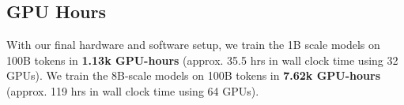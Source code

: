 
\subsection{GPU Hours}
\label{app:gpu-hour-logging}

With our final hardware and software setup, we train the 1B scale models on 100B tokens in \textbf{1.13k GPU-hours} (approx. 35.5 hrs in wall clock time using 32 GPUs). We train the 8B-scale models on 100B tokens in \textbf{7.62k GPU-hours} (approx. 119 hrs in wall clock time using 64 GPUs).

% 
